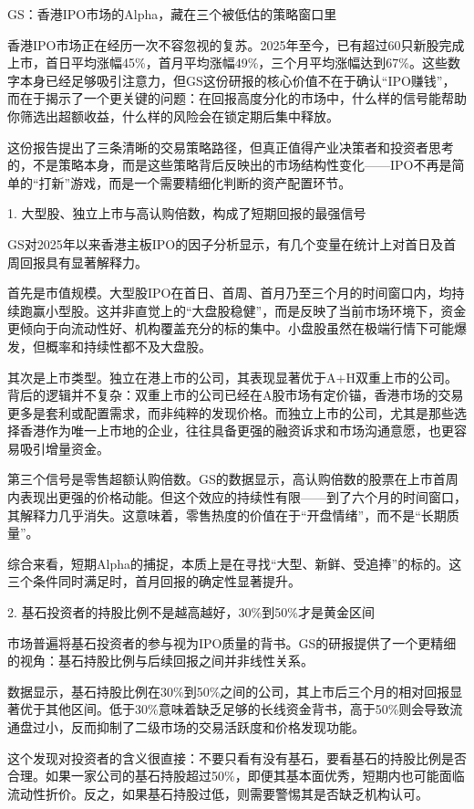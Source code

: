 \documentclass[11pt]{ctexart}
\begin{document}
GS：香港IPO市场的Alpha，藏在三个被低估的策略窗口里

香港IPO市场正在经历一次不容忽视的复苏。2025年至今，已有超过60只新股完成上市，首日平均涨幅45\%，首月平均涨幅49\%，三个月平均涨幅达到67\%。这些数字本身已经足够吸引注意力，但GS这份研报的核心价值不在于确认“IPO赚钱”，而在于揭示了一个更关键的问题：在回报高度分化的市场中，什么样的信号能帮助你筛选出超额收益，什么样的风险会在锁定期后集中释放。

这份报告提出了三条清晰的交易策略路径，但真正值得产业决策者和投资者思考的，不是策略本身，而是这些策略背后反映出的市场结构性变化——IPO不再是简单的“打新”游戏，而是一个需要精细化判断的资产配置环节。

1. 大型股、独立上市与高认购倍数，构成了短期回报的最强信号

GS对2025年以来香港主板IPO的因子分析显示，有几个变量在统计上对首日及首周回报具有显著解释力。

首先是市值规模。大型股IPO在首日、首周、首月乃至三个月的时间窗口内，均持续跑赢小型股。这并非直觉上的“大盘股稳健”，而是反映了当前市场环境下，资金更倾向于向流动性好、机构覆盖充分的标的集中。小盘股虽然在极端行情下可能爆发，但概率和持续性都不及大盘股。

其次是上市类型。独立在港上市的公司，其表现显著优于A+H双重上市的公司。背后的逻辑并不复杂：双重上市的公司已经在A股市场有定价锚，香港市场的交易更多是套利或配置需求，而非纯粹的发现价格。而独立上市的公司，尤其是那些选择香港作为唯一上市地的企业，往往具备更强的融资诉求和市场沟通意愿，也更容易吸引增量资金。

第三个信号是零售超额认购倍数。GS的数据显示，高认购倍数的股票在上市首周内表现出更强的价格动能。但这个效应的持续性有限——到了六个月的时间窗口，其解释力几乎消失。这意味着，零售热度的价值在于“开盘情绪”，而不是“长期质量”。

综合来看，短期Alpha的捕捉，本质上是在寻找“大型、新鲜、受追捧”的标的。这三个条件同时满足时，首月回报的确定性显著提升。

2. 基石投资者的持股比例不是越高越好，30\%到50\%才是黄金区间

市场普遍将基石投资者的参与视为IPO质量的背书。GS的研报提供了一个更精细的视角：基石持股比例与后续回报之间并非线性关系。

数据显示，基石持股比例在30\%到50\%之间的公司，其上市后三个月的相对回报显著优于其他区间。低于30\%意味着缺乏足够的长线资金背书，高于50\%则会导致流通盘过小，反而抑制了二级市场的交易活跃度和价格发现功能。

这个发现对投资者的含义很直接：不要只看有没有基石，要看基石的持股比例是否合理。如果一家公司的基石持股超过50\%，即便其基本面优秀，短期内也可能面临流动性折价。反之，如果基石持股过低，则需要警惕其是否缺乏机构认可。
\end{document}
